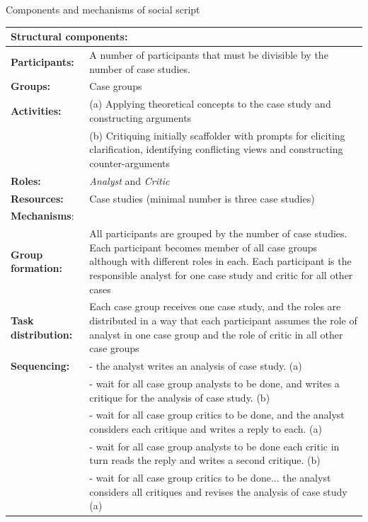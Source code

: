 \begin{quadro}[htb]
\caption{Components and mechanisms of social script}
\label{qua:social-script-framework-kobbe}
\centering
\footnotesize
\begin{tabular}{l p{12cm}}
\toprule
\multicolumn{2}{l}{\textbf{Structural components:}} \\ \midrule
\textbf{Participants:} &
A number of participants that must be divisible by the number of case studies.  \\
\textbf{Groups:} &
Case groups \\
\textbf{Activities:} &
(a) Applying theoretical concepts to the case study and constructing arguments \\
 &
(b) Critiquing initially scaffolder with prompts for eliciting clarification, identifying conflicting views and constructing counter-arguments \\
\textbf{Roles:} &
\emph{Analyst} and \emph{Critic} \\
\textbf{Resources:} &
Case studies (minimal number is three case studies) \\
\toprule
\multicolumn{2}{l}{\textbf{Mechanisms}:} \\ \midrule
\textbf{Group formation:} &
All participants are grouped by the number of case studies. Each participant becomes member of all case groups although with different roles in each. Each participant is the responsible analyst for one case study and critic for all other cases \\
\textbf{Task distribution:} &
Each case group receives one case study, and the roles are distributed in a way that each participant assumes the role of analyst in one case group and the role of critic in all other case groups \\
\textbf{Sequencing:}
& - the analyst writes an analysis of case study. (a) \\
& - wait for all case group analysts to be done, and writes a critique for the analysis of case study. (b) \\
& - wait for all case group critics to be done, and the analyst considers each critique and writes a reply to each. (a) \\
& - wait for all case group analysts to be done each critic in turn reads the reply and writes a second critique. (b) \\
& - wait for all case group critics to be done... the analyst considers all critiques and revises the analysis of case study (a) \\
\bottomrule
\end{tabular}
\end{quadro}


